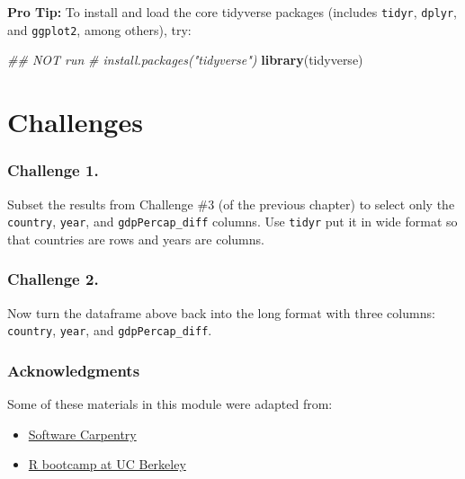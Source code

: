 \documentclass[]{book}
\newenvironment{Shaded}{\begin{snugshade}}{\end{snugshade}}
\newcommand{\CommentTok}[1]{\textcolor[rgb]{0.56,0.35,0.01}{\textit{#1}}}
\newcommand{\KeywordTok}[1]{\textcolor[rgb]{0.13,0.29,0.53}{\textbf{#1}}}
\newcommand{\NormalTok}[1]{#1}
\providecommand{\tightlist}{%
  \setlength{\itemsep}{0pt}\setlength{\parskip}{0pt}}
\begin{document}
\textbf{Pro Tip:} To install and load the core tidyverse packages (includes \texttt{tidyr}, \texttt{dplyr}, and \texttt{ggplot2}, among others), try:

\begin{Shaded}
\begin{Highlighting}[]
\CommentTok{## NOT run}
\CommentTok{# install.packages("tidyverse")}
\KeywordTok{library}\NormalTok{(tidyverse)}
\end{Highlighting}
\end{Shaded}

\hypertarget{challenges-12}{%
\section{Challenges}\label{challenges-12}}

\hypertarget{challenge-1.-7}{%
\subsubsection*{Challenge 1.}\label{challenge-1.-7}}

Subset the results from Challenge \#3 (of the previous chapter) to select only the \texttt{country}, \texttt{year}, and \texttt{gdpPercap\_diff} columns. Use \texttt{tidyr} put it in wide format so that countries are rows and years are columns.

\hypertarget{challenge-2.-7}{%
\subsubsection*{Challenge 2.}\label{challenge-2.-7}}

Now turn the dataframe above back into the long format with three columns: \texttt{country}, \texttt{year}, and \texttt{gdpPercap\_diff}.

\hypertarget{acknowledgments-4}{%
\subsubsection*{Acknowledgments}\label{acknowledgments-4}}

Some of these materials in this module were adapted from:

\begin{itemize}
\tightlist
\item
  \href{http://swcarpentry.github.io/r-novice-gapminder/}{Software Carpentry}
\item
  \href{https://github.com/berkeley-scf/r-bootcamp-fall-2019}{R bootcamp at UC Berkeley}
\end{itemize}
\end{document}
